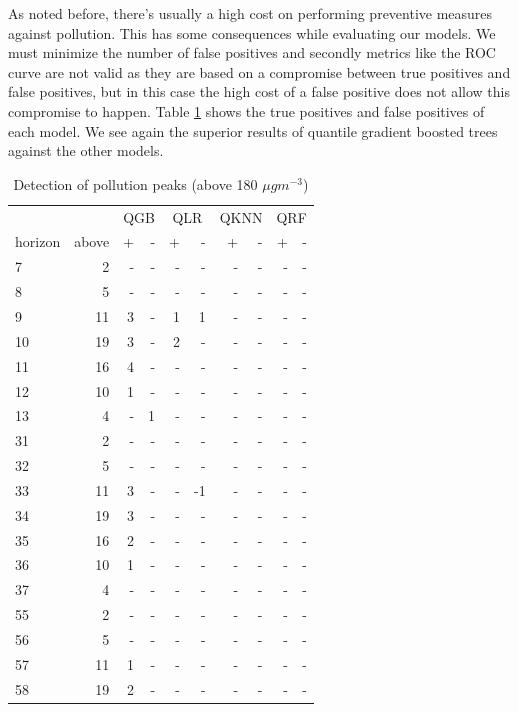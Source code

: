 \documentclass[a4paper,twocolumn,5p]{elsarticle}
\begin{document}
As noted before, there's usually a high cost on performing preventive
measures against pollution. This has some consequences while 
evaluating our models. We must minimize the number of false 
positives and secondly metrics like the ROC curve are not valid as 
they are based on a compromise between true positives 
and false positives,
but in this case the high cost of a false positive does not allow 
this compromise to happen. Table \ref{table:classif_hig} shows 
the true positives and false positives of each model. We see again the 
superior results of quantile gradient boosted trees against the other 
models.

\begin{table}[tbp]
  \centering
  \caption{
    Detection of \no pollution peaks (above 180 $\mu gm^{-3}$)
    \label{table:classif_hig}
  }
  \begin{tabular}{lr|rr|rr|rr|rr}
    \toprule 
    \multicolumn{2}{c}{} & \multicolumn{2}{c}{QGB} & \multicolumn{2}{c}{QLR} & \multicolumn{2}{c}{QKNN} & \multicolumn{2}{c}{QRF}   \\
    horizon &  above &  + &  - &  + &  - &  + &  - &  + &  - \\
    \midrule
    7  & 2 &- &   - &- &   - & - &    - &- &   - \\
    8  & 5 &- &   - &- &   - & - &    - &- &   - \\
    9  &11 & 3 &   - & 1 &   1 & - &    - &- &   - \\
    10 &19 & 3 &   - & 2 &   - & - &    - &- &   - \\
    11 &16 & 4 &   - &- &   - & - &    - &- &   - \\
    12 &10 & 1 &   - &- &   - & - &    - &- &   - \\
    13 & 4 &- &   1 &- &   - & - &    - &- &   - \\
    31 & 2 &- &   - &- &   - & - &    - &- &   - \\
    32 & 5 &- &   - &- &   - & - &    - &- &   - \\
    33 &11 & 3 &   - &- &   -1 & - &    - &- &   - \\
    34 &19 & 3 &   - &- &   - & - &    - &- &   - \\
    35 &16 & 2 &   - &- &   - & - &    - &- &   - \\
    36 &10 & 1 &   - &- &   - & - &    - &- &   - \\
    37 & 4 &- &   - &- &   - & - &    - &- &   - \\
    55 & 2 &- &   - &- &   - & - &    - &- &   - \\
    56 & 5 &- &   - &- &   - & - &    - &- &   - \\
    57 &11 & 1 &   - &- &   - & - &    - &- &   - \\
    58 &19 & 2 &   - &- &   - & - &    - &- &   - \\
    \bottomrule
    \end{tabular}
\end{table}
\end{document}
